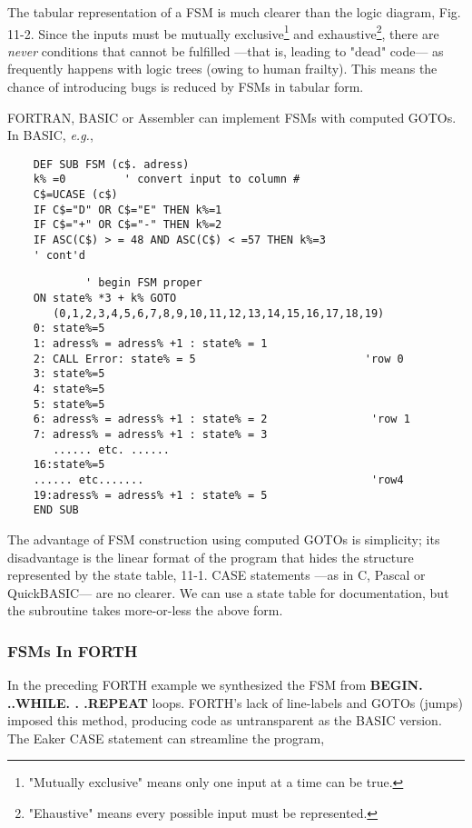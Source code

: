 The tabular representation of a FSM is much clearer than the logic diagram, Fig. 11-2. Since the inputs must be mutually exclusive\footnote{"Mutually exclusive" means only one input at a time can be true.} and exhaustive\footnote{"Ehaustive" means every possible input must be represented.}, there are \textit{never} conditions that cannot be fulfilled —that is, leading to "dead" code— as frequently happens with logic trees (owing to human frailty). This means the chance of introducing bugs is reduced by FSMs in tabular form.

FORTRAN, BASIC or Assembler can implement FSMs with computed GOTOs. In BASIC, \textit{e.g.},

\begin{verbatim}
    DEF SUB FSM (c$. adress)
    k% =0         ' convert input to column #
    C$=UCASE (c$)
    IF C$="D" OR C$="E" THEN k%=1
    IF C$="+" OR C$="-" THEN k%=2
    IF ASC(C$) > = 48 AND ASC(C$) < =57 THEN k%=3
    ' cont'd
\end{verbatim}

\begin{verbatim}
            ' begin FSM proper
    ON state% *3 + k% GOTO
       (0,1,2,3,4,5,6,7,8,9,10,11,12,13,14,15,16,17,18,19)
    0: state%=5
    1: adress% = adress% +1 : state% = 1
    2: CALL Error: state% = 5                          'row 0
    3: state%=5
    4: state%=5
    5: state%=5
    6: adress% = adress% +1 : state% = 2                'row 1
    7: adress% = adress% +1 : state% = 3
       ...... etc. ......
    16:state%=5
    ...... etc.......                                   'row4
    19:adress% = adress% +1 : state% = 5
    END SUB
\end{verbatim}

The advantage of FSM construction using computed GOTOs is simplicity; its disadvantage is the linear format of the program that hides the structure represented by the state table, 11-1. CASE statements —as in C, Pascal or QuickBASIC— are no clearer. We can use a state table for documentation, but the subroutine takes more-or-less the above form.

\subsubsection{FSMs In FORTH}

In the preceding FORTH example we synthesized the FSM from \textbf{BEGIN. ..WHILE. . .REPEAT} loops. FORTH’s lack of line-labels and GOTOs (jumps) imposed this method, producing code as untransparent as the BASIC version. The Eaker CASE statement can streamline the program,

